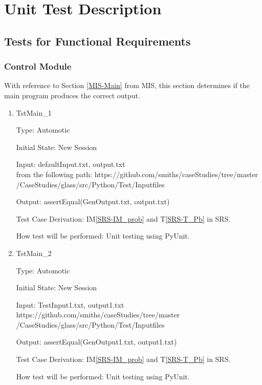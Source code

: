 \documentclass[12pt]{article}
\newcommand{\tref}[1]{T\ref{#1}}
\newcommand{\iref}[1]{IM\ref{#1}}
\begin{document}
\section{Unit Test Description}


\subsection{Tests for Functional Requirements}


\subsubsection{Control Module}
With reference to Section \ref{MIS-Main} from MIS, this section determines if the main program produces the correct output.

\begin{enumerate}

\item{TstMain\_1}

Type: Automotic
					
Initial State: New Session
					
Input: defaultInput.txt, output.txt\\ from the following path: https://github.com/smiths/caseStudies/tree/master
	/CaseStudies/glass/src/Python/Test/Inputfiles

					
Output: assertEqual(GenOutput.txt, output.txt)

Test Case Derivation: \iref{SRS-IM_prob} and \tref{SRS-T_Pb} in SRS.

How test will be performed: Unit testing using PyUnit.
					
\item{TstMain\_2\\}

Type: Automotic

Initial State: New Session

Input: TestInput1.txt, output1.txt\\ https://github.com/smiths/caseStudies/tree/master
/CaseStudies/glass/src/Python/Test/Inputfiles


Output: assertEqual(GenOutput1.txt, output1.txt)

Test Case Derivation: \iref{SRS-IM_prob} and \tref{SRS-T_Pb} in SRS.

How test will be performed: Unit testing using PyUnit.


    
\end{enumerate}
\end{document}
